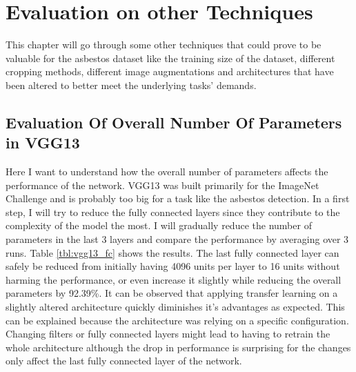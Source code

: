 \chapter{Evaluation on other Techniques}

This chapter will go through some other techniques that could prove to be valuable for the asbestos dataset like the training size of the dataset, different cropping methods, different image augmentations and architectures that have been altered to better meet the underlying tasks' demands.

\section{Evaluation Of Overall Number Of Parameters in VGG13}

Here I want to understand how the overall number of parameters affects the performance of the network. VGG13 was built primarily for the ImageNet Challenge and is probably too big for a task like the asbestos detection. In a first step, I will try to reduce the fully connected layers since they contribute to the complexity of the model the most. I will gradually reduce the number of parameters in the last 3 layers and compare the performance by averaging over 3 runs. Table \ref{tbl:vgg13_fc} shows the results. The last fully connected layer can safely be reduced from initially having 4096 units per layer to 16 units without harming the performance, or even increase it slightly while reducing the overall parameters by 92.39\%. It can be observed that applying transfer learning on a slightly altered architecture quickly diminishes it's advantages as expected. This can be explained because the architecture was relying on a specific configuration. Changing filters or fully connected layers might lead to having to retrain the whole architecture although the drop in performance is surprising for the changes only affect the last fully connected layer of the network. \\


